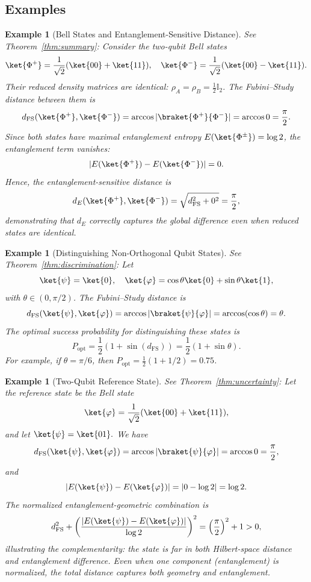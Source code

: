 \documentclass[aps,pra,reprint,nofootinbib,showpacs,superscriptaddress]{revtex4-1}
\newtheorem{example}[theorem]{Example}
\begin{document}
\subsection{Examples}
\begin{example}[Bell States and Entanglement-Sensitive Distance]
See Theorem~\ref{thm:summary}: Consider the two-qubit Bell states
\[
\ket{\Phi^+} = \frac{1}{\sqrt{2}}(\ket{00} + \ket{11}), \quad 
\ket{\Phi^-} = \frac{1}{\sqrt{2}}(\ket{00} - \ket{11}).
\]
Their reduced density matrices are identical: 
$\rho_A = \rho_B = \frac{1}{2}\mathbb{I}_2$. The Fubini--Study distance between them is
\[
d_{\text{FS}}(\ket{\Phi^+},\ket{\Phi^-}) = \arccos|\braket{\Phi^+}{\Phi^-}| = \arccos 0 = \frac{\pi}{2}.
\]
Since both states have maximal entanglement entropy $E(\ket{\Phi^\pm}) = \log 2$, the entanglement term vanishes:
\[
|E(\ket{\Phi^+}) - E(\ket{\Phi^-})| = 0.
\]
Hence, the entanglement-sensitive distance is
\[
d_E(\ket{\Phi^+},\ket{\Phi^-}) = \sqrt{d_{\text{FS}}^2 + 0^2} = \frac{\pi}{2},
\]
demonstrating that $d_E$ correctly captures the global difference even when reduced states are identical.
\end{example}
\begin{example}[Distinguishing Non-Orthogonal Qubit States]
See Theorem~\ref{thm:discrimination}:
Let
\[
\ket{\psi} = \ket{0}, \quad \ket{\varphi} = \cos\theta \ket{0} + \sin\theta \ket{1},
\]
with $\theta \in (0, \pi/2)$. The Fubini--Study distance is
\[
d_{\text{FS}}(\ket{\psi},\ket{\varphi}) = \arccos|\braket{\psi}{\varphi}| = \arccos(\cos\theta) = \theta.
\]
The optimal success probability for distinguishing these states is
\[
P_{\text{opt}} = \frac{1}{2}\left(1 + \sin(d_{\text{FS}})\right) = \frac{1}{2}(1 + \sin\theta).
\]
For example, if $\theta = \pi/6$, then $P_{\text{opt}} = \frac{1}{2}(1 + 1/2) = 0.75$.
\end{example}
\begin{example}[Two-Qubit Reference State]
See Theorem~\ref{thm:uncertainty}:
Let the reference state be the Bell state
\[
\ket{\varphi} = \frac{1}{\sqrt{2}}(\ket{00} + \ket{11}),
\]
and let
\(
\ket{\psi} = \ket{01}.
\)
We have
\[
d_{\text{FS}}(\ket{\psi},\ket{\varphi}) = \arccos|\braket{\psi}{\varphi}| = \arccos 0 = \frac{\pi}{2},
\]
and
\[
|E(\ket{\psi}) - E(\ket{\varphi})| = |0 - \log 2| = \log 2.
\]
The normalized entanglement-geometric combination is
\[
d_{\text{FS}}^2 + \left(\frac{|E(\ket{\psi}) - E(\ket{\varphi})|}{\log 2}\right)^2 
= \left(\frac{\pi}{2}\right)^2 + 1 > 0,
\]
illustrating the complementarity: the state is far in both Hilbert-space distance and entanglement difference.  
Even when one component (entanglement) is normalized, the total distance captures both geometry and entanglement.
\end{example}
\end{document}
